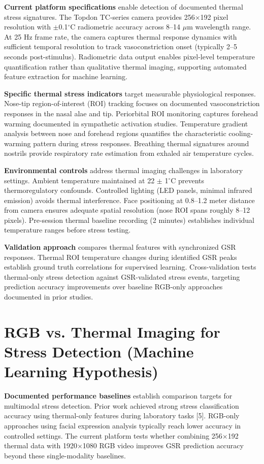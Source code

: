 \textbf{Current platform specifications} enable detection of documented thermal stress signatures. The Topdon TC-series camera provides 256$\times$192 pixel resolution with $\pm$0.1$^\circ$C radiometric accuracy across 8--14 $\mu$m wavelength range. At 25 Hz frame rate, the camera captures thermal response dynamics with sufficient temporal resolution to track vasoconstriction onset (typically 2--5 seconds post-stimulus). Radiometric data output enables pixel-level temperature quantification rather than qualitative thermal imaging, supporting automated feature extraction for machine learning.

\textbf{Specific thermal stress indicators} target measurable physiological responses. Nose-tip region-of-interest (ROI) tracking focuses on documented vasoconstriction responses in the nasal alae and tip. Periorbital ROI monitoring captures forehead warming documented in sympathetic activation studies. Temperature gradient analysis between nose and forehead regions quantifies the characteristic cooling-warming pattern during stress responses. Breathing thermal signatures around nostrils provide respiratory rate estimation from exhaled air temperature cycles.

\textbf{Environmental controls} address thermal imaging challenges in laboratory settings. Ambient temperature maintained at 22 $\pm$ 1$^\circ$C prevents thermoregulatory confounds. Controlled lighting (LED panels, minimal infrared emission) avoids thermal interference. Face positioning at 0.8--1.2 meter distance from camera ensures adequate spatial resolution (nose ROI spans roughly 8--12 pixels). Pre-session thermal baseline recording (2 minutes) establishes individual temperature ranges before stress testing.

\textbf{Validation approach} compares thermal features with synchronized GSR responses. Thermal ROI temperature changes during identified GSR peaks establish ground truth correlations for supervised learning. Cross-validation tests thermal-only stress detection against GSR-validated stress events, targeting prediction accuracy improvements over baseline RGB-only approaches documented in prior studies.

\section{RGB vs. Thermal Imaging for Stress Detection (Machine Learning Hypothesis)}
\textbf{Documented performance baselines} establish comparison targets for multimodal stress detection. Prior work achieved strong stress classification accuracy using thermal-only features during laboratory tasks [5]. RGB-only approaches using facial expression analysis typically reach lower accuracy in controlled settings. The current platform tests whether combining 256$\times$192 thermal data with 1920$\times$1080 RGB video improves GSR prediction accuracy beyond these single-modality baselines.

